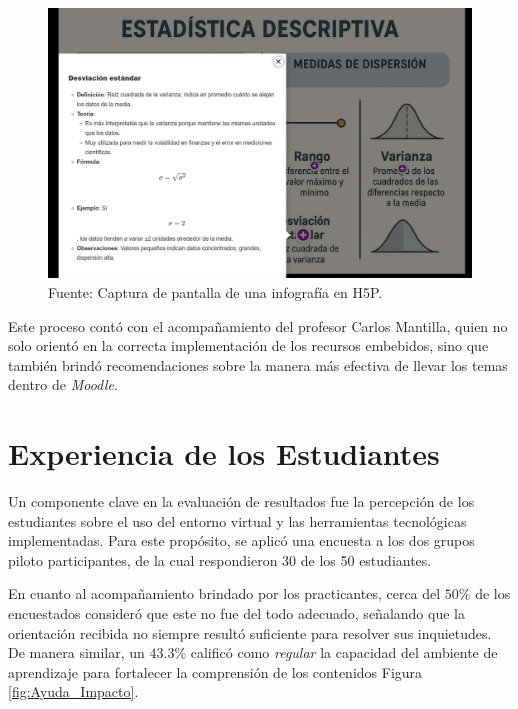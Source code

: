 \documentclass[letter,oneside,12pt,spanish]{report}
\begin{document}
\begin{figure}[ht]
	\centering
	\includegraphics[width=1\textwidth]{Figs/Infografia_H5P.pdf}
	\label{fig:H5P}
	\\Fuente: Captura de pantalla de una infografía en H5P.
\end{figure}


Este proceso contó con el acompañamiento del profesor Carlos Mantilla, quien no solo orientó en la correcta implementación de los recursos embebidos, sino que también brindó recomendaciones sobre la manera más efectiva de llevar los temas dentro de \textit{Moodle}.

\section{Experiencia de los Estudiantes}

Un componente clave en la evaluación de resultados fue la percepción de los estudiantes sobre el uso del entorno virtual y las herramientas tecnológicas implementadas. Para este propósito, se aplicó una encuesta a los dos grupos piloto participantes, de la cual respondieron 30 de los 50 estudiantes.

En cuanto al acompañamiento brindado por los practicantes, cerca del $50\%$ de los encuestados consideró que este no fue del todo adecuado, señalando que la orientación recibida no siempre resultó suficiente para resolver sus inquietudes. De manera similar, un $43.3\%$ calificó como \textit{regular} la capacidad del ambiente de aprendizaje para fortalecer la comprensión de los contenidos Figura \ref{fig:Ayuda_Impacto}.
\end{document}
